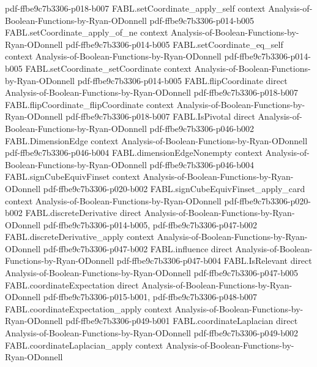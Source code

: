 \begin{theorem}
{    pdf-ffbe9c7b3306-p018-b007}
\proofstep
  {FABL.setCoordinate_apply_self}
  {context}
  {Analysis-of-Boolean-Functions-by-Ryan-ODonnell}
  {pdf-ffbe9c7b3306-p014-b005}
\proofstep
  {FABL.setCoordinate_apply_of_ne}
  {context}
  {Analysis-of-Boolean-Functions-by-Ryan-ODonnell}
  {pdf-ffbe9c7b3306-p014-b005}
\proofstep
  {FABL.setCoordinate_eq_self}
  {context}
  {Analysis-of-Boolean-Functions-by-Ryan-ODonnell}
  {pdf-ffbe9c7b3306-p014-b005}
\proofstep
  {FABL.setCoordinate_setCoordinate}
  {context}
  {Analysis-of-Boolean-Functions-by-Ryan-ODonnell}
  {pdf-ffbe9c7b3306-p014-b005}
\proofstep
  {FABL.flipCoordinate}
  {direct}
  {Analysis-of-Boolean-Functions-by-Ryan-ODonnell}
  {pdf-ffbe9c7b3306-p018-b007}
\proofstep
  {FABL.flipCoordinate_flipCoordinate}
  {context}
  {Analysis-of-Boolean-Functions-by-Ryan-ODonnell}
  {pdf-ffbe9c7b3306-p018-b007}
\proofstep
  {FABL.IsPivotal}
  {direct}
  {Analysis-of-Boolean-Functions-by-Ryan-ODonnell}
  {pdf-ffbe9c7b3306-p046-b002}
\proofstep
  {FABL.DimensionEdge}
  {context}
  {Analysis-of-Boolean-Functions-by-Ryan-ODonnell}
  {pdf-ffbe9c7b3306-p046-b004}
\proofstep
  {FABL.dimensionEdgeNonempty}
  {context}
  {Analysis-of-Boolean-Functions-by-Ryan-ODonnell}
  {pdf-ffbe9c7b3306-p046-b004}
\proofstep
  {FABL.signCubeEquivFinset}
  {context}
  {Analysis-of-Boolean-Functions-by-Ryan-ODonnell}
  {pdf-ffbe9c7b3306-p020-b002}
\proofstep
  {FABL.signCubeEquivFinset_apply_card}
  {context}
  {Analysis-of-Boolean-Functions-by-Ryan-ODonnell}
  {pdf-ffbe9c7b3306-p020-b002}
\proofstep
  {FABL.discreteDerivative}
  {direct}
  {Analysis-of-Boolean-Functions-by-Ryan-ODonnell}
  {pdf-ffbe9c7b3306-p014-b005,
    pdf-ffbe9c7b3306-p047-b002}
\proofstep
  {FABL.discreteDerivative_apply}
  {context}
  {Analysis-of-Boolean-Functions-by-Ryan-ODonnell}
  {pdf-ffbe9c7b3306-p047-b002}
\proofstep
  {FABL.influence}
  {direct}
  {Analysis-of-Boolean-Functions-by-Ryan-ODonnell}
  {pdf-ffbe9c7b3306-p047-b004}
\proofstep
  {FABL.IsRelevant}
  {direct}
  {Analysis-of-Boolean-Functions-by-Ryan-ODonnell}
  {pdf-ffbe9c7b3306-p047-b005}
\proofstep
  {FABL.coordinateExpectation}
  {direct}
  {Analysis-of-Boolean-Functions-by-Ryan-ODonnell}
  {pdf-ffbe9c7b3306-p015-b001,
    pdf-ffbe9c7b3306-p048-b007}
\proofstep
  {FABL.coordinateExpectation_apply}
  {context}
  {Analysis-of-Boolean-Functions-by-Ryan-ODonnell}
  {pdf-ffbe9c7b3306-p049-b001}
\proofstep
  {FABL.coordinateLaplacian}
  {direct}
  {Analysis-of-Boolean-Functions-by-Ryan-ODonnell}
  {pdf-ffbe9c7b3306-p049-b002}
\proofstep
  {FABL.coordinateLaplacian_apply}
  {context}
  {Analysis-of-Boolean-Functions-by-Ryan-ODonnell}

\end{theorem}

